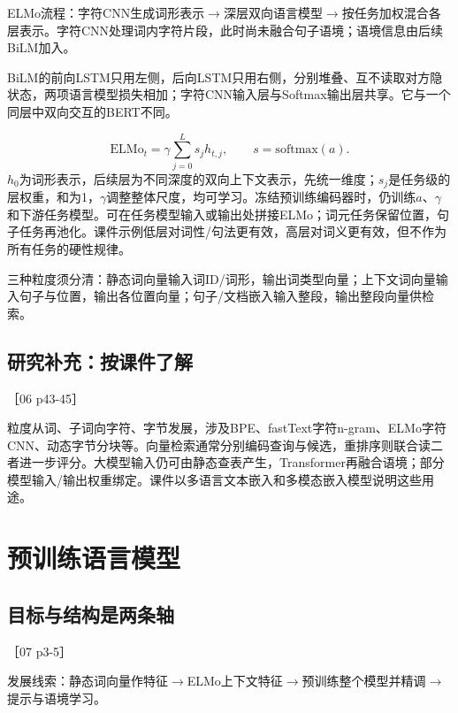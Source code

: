 \documentclass[UTF8,a4paper,zihao=-4,fontset=windows]{ctexart}
\newcommand{\source}[1]{{\small #1}\par}
\begin{document}
ELMo流程：字符CNN生成词形表示\ensuremath{\rightarrow}深层双向语言模型\ensuremath{\rightarrow}按任务加权混合各层表示。字符CNN处理词内字符片段，此时尚未融合句子语境；语境信息由后续BiLM加入。

BiLM的前向LSTM只用左侧，后向LSTM只用右侧，分别堆叠、互不读取对方隐状态，两项语言模型损失相加；字符CNN输入层与Softmax输出层共享。它与一个同层中双向交互的BERT不同。

\[\mathrm{ELMo}_t=\gamma\sum_{j=0}^{L}s_jh_{t,j},\qquad s=\mathrm{softmax}(a).\]
$h_0$为词形表示，后续层为不同深度的双向上下文表示，先统一维度；$s_j$是任务级的层权重，和为1，$\gamma$调整整体尺度，均可学习。冻结预训练编码器时，仍训练$a$、$\gamma$和下游任务模型。可在任务模型输入或输出处拼接ELMo；词元任务保留位置，句子任务再池化。课件示例低层对词性/\allowbreak{}句法更有效，高层对词义更有效，但不作为所有任务的硬性规律。

三种粒度须分清：静态词向量输入词ID/\allowbreak{}词形，输出词类型向量；上下文词向量输入句子与位置，输出各位置向量；句子/\allowbreak{}文档嵌入输入整段，输出整段向量供检索。

\subsection{研究补充：按课件了解}
\source{［06 p43-45］}
粒度从词、子词向字符、字节发展，涉及BPE、fastText字符n-gram、ELMo字符CNN、动态字节分块等。向量检索通常分别编码查询与候选，重排序则联合读二者进一步评分。大模型输入仍可由静态查表产生，Transformer再融合语境；部分模型输入/\allowbreak{}输出权重绑定。课件以多语言文本嵌入和多模态嵌入模型说明这些用途。

\section{预训练语言模型}
\subsection{目标与结构是两条轴}
\source{［07 p3-5］}
发展线索：静态词向量作特征\ensuremath{\rightarrow}ELMo上下文特征\ensuremath{\rightarrow}预训练整个模型并精调\ensuremath{\rightarrow}提示与语境学习。
\end{document}
